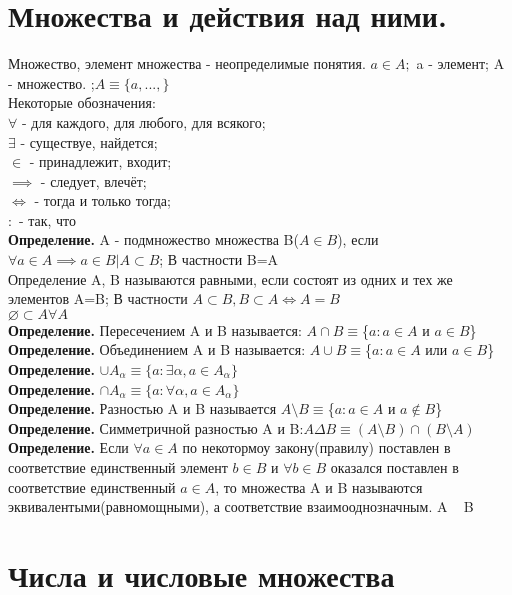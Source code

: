 \documentclass[../main.tex]{subfiles}
\begin{document}
\section{Множества и действия над ними.}
Множество, элемент множества - неопределимые понятия.
$a\in A;$ a - элемент; A - множество. ;$A\equiv\{a,...,\}$\\
Некоторые обозначения:\\
$\forall$ - для каждого, для любого, для всякого;\\
$\exists$ - существуе, найдется;\\
$\in$ - принадлежит, входит;\\
$\implies$ - следует, влечёт;\\
$\Leftrightarrow$ - тогда и только тогда;\\
$:$ - так, что\\
\textbf{Определение.} A - подмножество множества B($A\in B$), если $\forall a \in A \implies a\in B | A\subset B$; В частности B=A\\
Определение A, B называются равными, если состоят из одних и тех же элементов A=B; В частности $ A\subset B, B\subset A \Leftrightarrow A=B$\\
$\varnothing \subset A\forall A$\\
\textbf{Определение.} Пересечением A и B называется: $A \cap B \equiv $\{$a:a\in A$ и $a\in B$\}\\
\textbf{Определение.} Объединением A и B называется: $A \cup B \equiv $\{$a:a\in A$ или $a\in B$\}\\
\textbf{Определение.} $\cup A_\alpha \equiv\{a: \exists\alpha, a \in A_\alpha\}$\\
\textbf{Определение.} $\cap A_\alpha \equiv\{a:\forall\alpha,a\in A_\alpha\}$\\
\textbf{Определение.} Разностью A и B называется $A\setminus B\equiv$\{$a:a \in A$ и $a\notin B$\}\\
\textbf{Определение.} Симметричной разностью A и B:$A\Delta B\equiv(A\setminus B)\cap (B\setminus A)$\\
\textbf{Определение.} Если $\forall a \in A$ по некотормоу закону(правилу) поставлен в соответствие единственный элемент $b\in B$ и 
$\forall b \in B$ оказался поставлен в соответствие единственный $a\in A$, то множества A и B называются эквивалентыми(равномощными),
а соответствие взаимооднозначным. A ~ B\\

\section{Числа и числовые множества}
\end{document}
